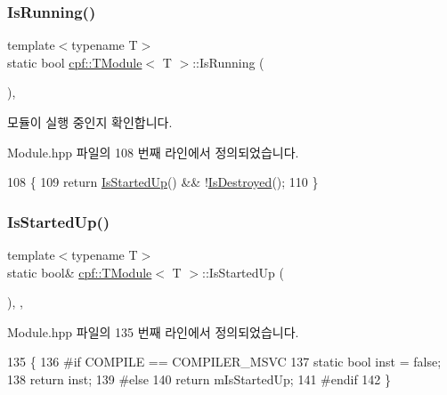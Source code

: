 \subsubsection{\texorpdfstring{Is\+Running()}{IsRunning()}}
{\footnotesize\ttfamily template$<$typename T$>$ \\
static bool \hyperlink{classcpf_1_1_t_module}{cpf\+::\+T\+Module}$<$ T $>$\+::Is\+Running (\begin{DoxyParamCaption}{ }\end{DoxyParamCaption})\hspace{0.3cm}{\ttfamily [inline]}, {\ttfamily [static]}}

모듈이 실행 중인지 확인합니다. 

Module.\+hpp 파일의 108 번째 라인에서 정의되었습니다.


\begin{DoxyCode}
108                                 \{
109             \textcolor{keywordflow}{return} \hyperlink{classcpf_1_1_t_module_a73732afee7131dad652bf3e00c75cef9}{IsStartedUp}() && !\hyperlink{classcpf_1_1_t_module_a9f70f0a70ac59b13b7a874f82c877337}{IsDestroyed}();
110         \}
\end{DoxyCode}
\mbox{\label{classcpf_1_1_t_module_a73732afee7131dad652bf3e00c75cef9}} 
\subsubsection{\texorpdfstring{Is\+Started\+Up()}{IsStartedUp()}}
{\footnotesize\ttfamily template$<$typename T$>$ \\
static bool\& \hyperlink{classcpf_1_1_t_module}{cpf\+::\+T\+Module}$<$ T $>$\+::Is\+Started\+Up (\begin{DoxyParamCaption}{ }\end{DoxyParamCaption})\hspace{0.3cm}{\ttfamily [inline]}, {\ttfamily [static]}, {\ttfamily [private]}}



Module.\+hpp 파일의 135 번째 라인에서 정의되었습니다.


\begin{DoxyCode}
135                                    \{
136 \textcolor{preprocessor}{#if COMPILE == COMPILER\_MSVC}
137             \textcolor{keyword}{static} \textcolor{keywordtype}{bool} inst = \textcolor{keyword}{false};
138             \textcolor{keywordflow}{return} inst;
139 \textcolor{preprocessor}{#else}
140             \textcolor{keywordflow}{return} mIsStartedUp;
141 \textcolor{preprocessor}{#endif}
142         \}
\end{DoxyCode}
\mbox{\label{classcpf_1_1_t_module_a15c93b1aca54022e145961bea8e3ea7d}} 
